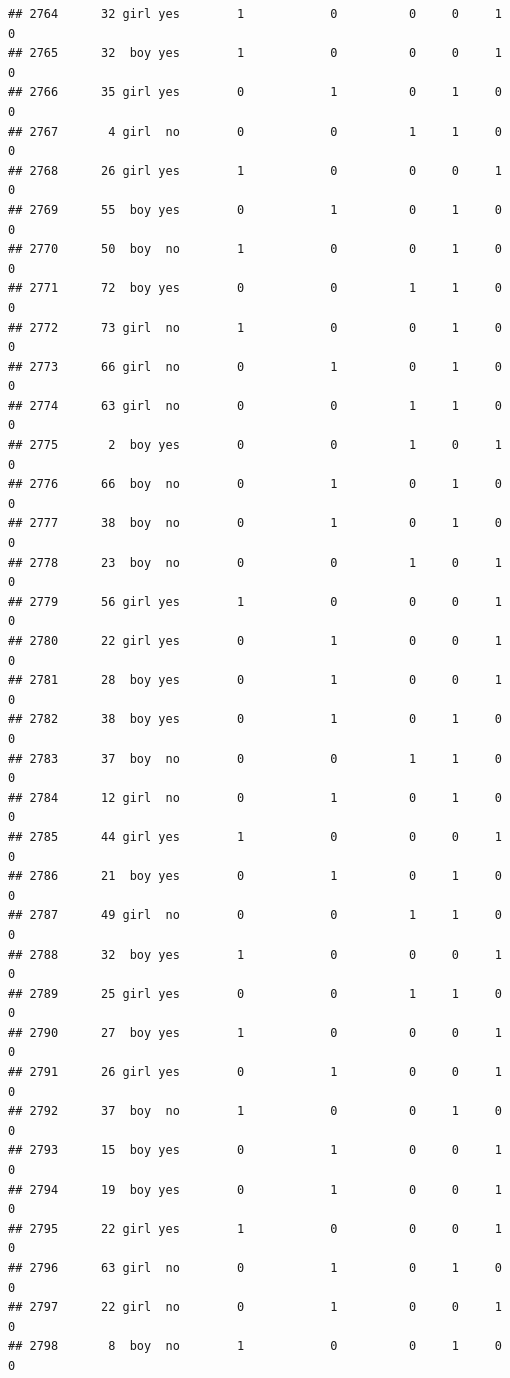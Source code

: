 \documentclass[man]{apa6}
\begin{document}
\begin{verbatim}
## 2764      32 girl yes        1            0          0     0     1     0
## 2765      32  boy yes        1            0          0     0     1     0
## 2766      35 girl yes        0            1          0     1     0     0
## 2767       4 girl  no        0            0          1     1     0     0
## 2768      26 girl yes        1            0          0     0     1     0
## 2769      55  boy yes        0            1          0     1     0     0
## 2770      50  boy  no        1            0          0     1     0     0
## 2771      72  boy yes        0            0          1     1     0     0
## 2772      73 girl  no        1            0          0     1     0     0
## 2773      66 girl  no        0            1          0     1     0     0
## 2774      63 girl  no        0            0          1     1     0     0
## 2775       2  boy yes        0            0          1     0     1     0
## 2776      66  boy  no        0            1          0     1     0     0
## 2777      38  boy  no        0            1          0     1     0     0
## 2778      23  boy  no        0            0          1     0     1     0
## 2779      56 girl yes        1            0          0     0     1     0
## 2780      22 girl yes        0            1          0     0     1     0
## 2781      28  boy yes        0            1          0     0     1     0
## 2782      38  boy yes        0            1          0     1     0     0
## 2783      37  boy  no        0            0          1     1     0     0
## 2784      12 girl  no        0            1          0     1     0     0
## 2785      44 girl yes        1            0          0     0     1     0
## 2786      21  boy yes        0            1          0     1     0     0
## 2787      49 girl  no        0            0          1     1     0     0
## 2788      32  boy yes        1            0          0     0     1     0
## 2789      25 girl yes        0            0          1     1     0     0
## 2790      27  boy yes        1            0          0     0     1     0
## 2791      26 girl yes        0            1          0     0     1     0
## 2792      37  boy  no        1            0          0     1     0     0
## 2793      15  boy yes        0            1          0     0     1     0
## 2794      19  boy yes        0            1          0     0     1     0
## 2795      22 girl yes        1            0          0     0     1     0
## 2796      63 girl  no        0            1          0     1     0     0
## 2797      22 girl  no        0            1          0     0     1     0
## 2798       8  boy  no        1            0          0     1     0     0

\end{verbatim}
\end{document}
